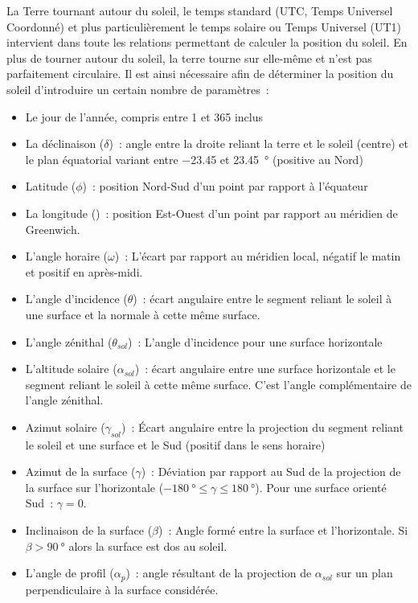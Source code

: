 La Terre tournant autour du soleil, le temps standard (UTC, Temps Universel Coordonné)
et plus particulièrement le temps solaire ou Temps Universel (UT1) intervient dans
toute les relations permettant de calculer la position du soleil.
En plus de tourner autour du soleil, la terre tourne sur elle-même et n’est pas
parfaitement circulaire. Il est ainsi nécessaire afin de déterminer la position
du soleil d’introduire un certain nombre de paramètres~:
\begin{itemize}
    \item Le jour de l’année, compris entre 1 et 365 inclus
    \item La déclinaison ($\delta$)~: angle entre la droite reliant la terre et le soleil
          (centre) et le plan équatorial variant entre \num{-23.45} et \SI{23.45}{\degree}
          (positive au Nord)
    \item Latitude ($\phi$)~: position Nord-Sud d’un point par rapport à l’équateur
    \item La longitude ()~: position Est-Ouest d’un point par rapport au méridien de Greenwich.
    \item L’angle horaire ($\omega$)~: L’écart par rapport au méridien local, négatif le
          matin et positif en après-midi.
    \item L’angle d’incidence ($\theta$)~: écart angulaire entre le segment reliant le soleil
          à une surface et la normale à cette même surface.
    \item L’angle zénithal ($\theta_{sol}$)~: L’angle d’incidence pour une surface horizontale
    \item L’altitude solaire ($\alpha_{sol}$)~: écart angulaire entre une surface horizontale et le segment reliant
          le soleil à cette même surface. C’est l’angle complémentaire
          de l’angle zénithal.
    \item Azimut solaire ($\gamma_{sol}$)~: Écart angulaire entre la projection du segment reliant
          le soleil et une surface et le Sud (positif dans le sens horaire)
    \item Azimut de la surface ($\gamma$)~: Déviation par rapport au Sud de la projection
          de la surface sur l’horizontale ($\SI{-180}{\degree} \leq \gamma \leq \SI{180}{\degree}$). Pour une surface orienté Sud~: $\gamma=0$.
    \item Inclinaison de la surface ($\beta$)~: Angle formé entre la surface et l’horizontale.
          Si $\beta > \SI{90}{\degree}$ alors la surface est dos au soleil.
    \item L’angle de profil ($\alpha_{p}$)~: angle résultant de la projection de $\alpha_{sol}$ sur un plan perpendiculaire
          à la surface considérée.
\end{itemize}
